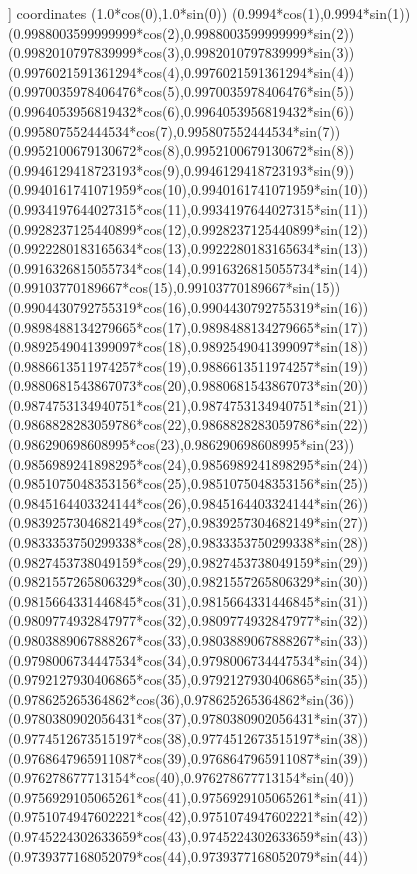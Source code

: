 ] coordinates {
({1.0*cos(0)},{1.0*sin(0)})
({0.9994*cos(1)},{0.9994*sin(1)})
({0.9988003599999999*cos(2)},{0.9988003599999999*sin(2)})
({0.9982010797839999*cos(3)},{0.9982010797839999*sin(3)})
({0.9976021591361294*cos(4)},{0.9976021591361294*sin(4)})
({0.9970035978406476*cos(5)},{0.9970035978406476*sin(5)})
({0.9964053956819432*cos(6)},{0.9964053956819432*sin(6)})
({0.995807552444534*cos(7)},{0.995807552444534*sin(7)})
({0.9952100679130672*cos(8)},{0.9952100679130672*sin(8)})
({0.9946129418723193*cos(9)},{0.9946129418723193*sin(9)})
({0.9940161741071959*cos(10)},{0.9940161741071959*sin(10)})
({0.9934197644027315*cos(11)},{0.9934197644027315*sin(11)})
({0.9928237125440899*cos(12)},{0.9928237125440899*sin(12)})
({0.9922280183165634*cos(13)},{0.9922280183165634*sin(13)})
({0.9916326815055734*cos(14)},{0.9916326815055734*sin(14)})
({0.99103770189667*cos(15)},{0.99103770189667*sin(15)})
({0.9904430792755319*cos(16)},{0.9904430792755319*sin(16)})
({0.9898488134279665*cos(17)},{0.9898488134279665*sin(17)})
({0.9892549041399097*cos(18)},{0.9892549041399097*sin(18)})
({0.9886613511974257*cos(19)},{0.9886613511974257*sin(19)})
({0.9880681543867073*cos(20)},{0.9880681543867073*sin(20)})
({0.9874753134940751*cos(21)},{0.9874753134940751*sin(21)})
({0.9868828283059786*cos(22)},{0.9868828283059786*sin(22)})
({0.986290698608995*cos(23)},{0.986290698608995*sin(23)})
({0.9856989241898295*cos(24)},{0.9856989241898295*sin(24)})
({0.9851075048353156*cos(25)},{0.9851075048353156*sin(25)})
({0.9845164403324144*cos(26)},{0.9845164403324144*sin(26)})
({0.9839257304682149*cos(27)},{0.9839257304682149*sin(27)})
({0.9833353750299338*cos(28)},{0.9833353750299338*sin(28)})
({0.9827453738049159*cos(29)},{0.9827453738049159*sin(29)})
({0.9821557265806329*cos(30)},{0.9821557265806329*sin(30)})
({0.9815664331446845*cos(31)},{0.9815664331446845*sin(31)})
({0.9809774932847977*cos(32)},{0.9809774932847977*sin(32)})
({0.9803889067888267*cos(33)},{0.9803889067888267*sin(33)})
({0.9798006734447534*cos(34)},{0.9798006734447534*sin(34)})
({0.9792127930406865*cos(35)},{0.9792127930406865*sin(35)})
({0.978625265364862*cos(36)},{0.978625265364862*sin(36)})
({0.9780380902056431*cos(37)},{0.9780380902056431*sin(37)})
({0.9774512673515197*cos(38)},{0.9774512673515197*sin(38)})
({0.9768647965911087*cos(39)},{0.9768647965911087*sin(39)})
({0.976278677713154*cos(40)},{0.976278677713154*sin(40)})
({0.9756929105065261*cos(41)},{0.9756929105065261*sin(41)})
({0.9751074947602221*cos(42)},{0.9751074947602221*sin(42)})
({0.9745224302633659*cos(43)},{0.9745224302633659*sin(43)})
({0.9739377168052079*cos(44)},{0.9739377168052079*sin(44)})
}
